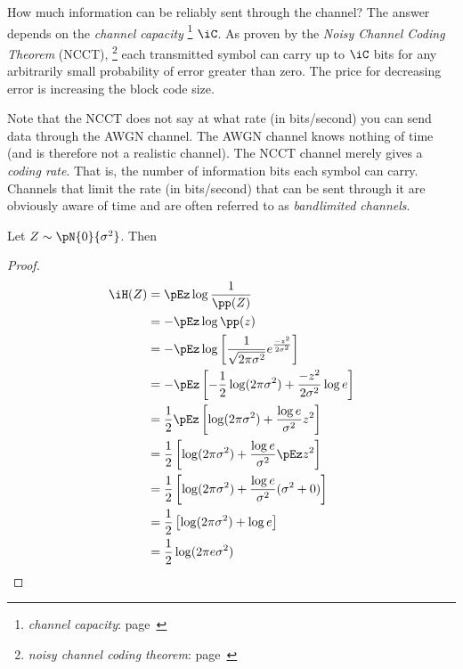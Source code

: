 How much information can be reliably sent through the channel?
The answer depends on the {\em channel capacity} 
\footnote{{\em channel capacity}: 
   page~\pageref{def:iC}
  }
$\iC$.
As proven by the {\em Noisy Channel Coding Theorem} (NCCT),
\footnote{{\em noisy channel coding theorem}:
   page~\pageref{thm:ncct}
  }
each transmitted symbol can carry up to $\iC$ bits for any arbitrarily 
small probability of error greater than zero.
The price for decreasing error is increasing the block code size.

Note that the NCCT does not say at what rate
(in bits/second) you can send data through the AWGN channel.
The AWGN channel knows nothing of time (and is therefore not a 
realistic channel). 
The NCCT channel merely gives a {\em coding rate}.
That is, the number of information bits each symbol can carry.
Channels that limit the rate (in bits/second) that can be sent through
it are obviously aware of time and are often referred to as 
{\em bandlimited channels}.

\begin{theorem}
Let $Z\sim\pN{0}{\sigma^2}$. Then
\end{theorem}
\begin{proof}
\begin{align*}
  \iH(Z)
    &= \pEz \log \frac{1}{\pp(Z)}
  \\&= -\pEz \log \pp(z) 
  \\&= -\pEz
        \log \left[\frac{1}{\sqrt{2\pi\sigma^2}}e^{\frac{-z^2}{2\sigma^2}} \right] 
  \\&= -\pEz \left[
       -\frac{1}{2}\log(2\pi\sigma^2) 
       + \frac{-z^2}{2\sigma^2} \log e 
       \right] 
  \\&= \frac{1}{2} \pEz \left[
       \log(2\pi\sigma^2) 
       + \frac{\log e}{\sigma^2}z^2  
       \right] 
  \\&= \frac{1}{2} \left[
       \log(2\pi\sigma^2) + \frac{\log e}{\sigma^2}\pEz z^2  
       \right] 
  \\&= \frac{1}{2} \left[
       \log(2\pi\sigma^2) + \frac{\log e}{\sigma^2}(\sigma^2+0)
       \right] 
  \\&= \frac{1}{2} \left[
       \log(2\pi\sigma^2) + \log e
       \right] 
  \\&= \frac{1}{2} \log(2\pi e\sigma^2) 
\end{align*}
\end{proof}

